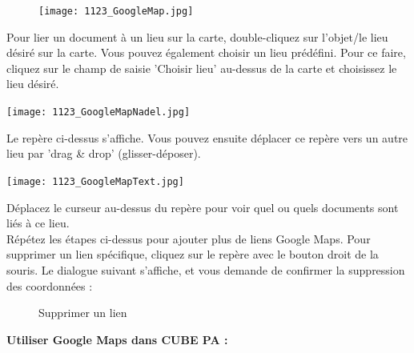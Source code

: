 \vspace{2mm}

\begin{figure}
\vspace{-15pt}
\texttt{[image: 1123\_GoogleMap.jpg]}
\end{figure}

Pour lier un document à un lieu sur la carte, double-cliquez sur l'objet/le lieu désiré sur la carte. Vous pouvez également choisir un lieu prédéfini. Pour ce faire, cliquez sur le champ de saisie 'Choisir lieu' au-dessus de la carte et choisissez le lieu désiré.

\vspace{4mm}

\hspace{15mm} \texttt{[image: 1123\_GoogleMapNadel.jpg]}

Le repère ci-dessus s'affiche. Vous pouvez ensuite déplacer ce repère vers un autre lieu par 'drag \& drop' (glisser-déposer).

\hspace{15mm} \texttt{[image: 1123\_GoogleMapText.jpg]}

Déplacez le curseur au-dessus du repère pour voir quel ou quels documents sont liés à ce lieu. \\

Répétez les étapes ci-dessus pour ajouter plus de liens Google Maps. Pour supprimer un lien spécifique, cliquez sur le repère avec le bouton droit de la souris. Le dialogue suivant s'affiche, et vous demande de confirmer la suppression des coordonnées : 

\begin{figure}[H]
\caption{Supprimer un lien}
\end{figure}

\vspace{\baselineskip}

\textbf{Utiliser Google Maps dans CUBE PA :}

